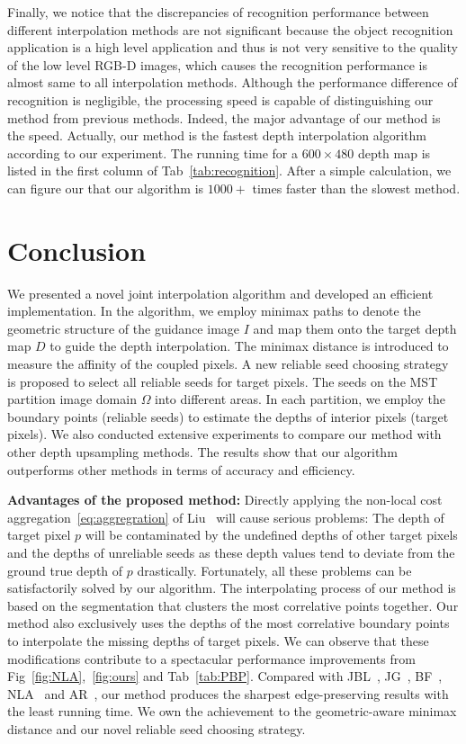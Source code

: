 \documentclass[preprint,10pt,5p,times,twocolumn]{elsarticle}
\begin{document}
Finally, we notice that the discrepancies of recognition performance between different interpolation methods are not significant because the object recognition application is a high level application and thus is not very sensitive to the quality of the low level RGB-D images, which causes the recognition performance is almost same to all interpolation methods. Although the performance difference of recognition is negligible, the processing speed is capable of distinguishing our method from previous methods. Indeed, the major advantage of our method is the speed. Actually, our method is the fastest depth interpolation algorithm according to our experiment. The running time for a $600 \times 480$ depth map is listed in the first column of Tab~\ref{tab:recognition}. After a simple calculation, we can figure our that our algorithm is $1000+$ times faster than the slowest method.



\section{Conclusion}

We presented a novel joint interpolation algorithm and developed an efficient implementation. In the algorithm, we employ minimax paths to denote the geometric structure of the guidance image $I$ and map them onto the target depth map $D$ to guide the depth interpolation. The minimax distance is introduced to measure the affinity of the coupled pixels. A new reliable seed choosing strategy is proposed to select all reliable seeds for target pixels. The seeds on the MST partition image domain $\Omega$ into different areas. In each partition, we employ the boundary points (reliable seeds) to estimate the depths of interior pixels (target pixels). We also conducted extensive experiments to compare our method with other depth upsampling methods. The results show that our algorithm outperforms other methods in terms of accuracy and efficiency.

\textbf{Advantages of the proposed method:} Directly applying the non-local cost aggregation~\eqref{eq:aggregration} of Liu~\cite{Liu2013} will cause serious problems: The depth of target pixel $p$ will be contaminated by the undefined depths of other target pixels and the depths of unreliable seeds as these depth values tend to deviate from the ground true depth of $p$ drastically. Fortunately, all these problems can be satisfactorily solved by our algorithm. The interpolating process of our method is based on the segmentation that clusters the most correlative points together. Our method also exclusively uses the depths of the most correlative boundary points to interpolate the missing depths of target pixels. We can observe that these modifications contribute to a spectacular performance improvements from Fig~\ref{fig:NLA},~\ref{fig:ours} and Tab~\ref{tab:PBP}. Compared with JBL~\cite{Kopf2007}, JG~\cite{Liu2013}, BF~\cite{YangQingxiong2007}, NLA~\cite{Yang2012} and AR~\cite{YangJingyu2012}, our method produces the sharpest edge-preserving results with the least running time. We own the achievement to the geometric-aware minimax distance and our novel reliable seed choosing strategy.
\end{document}
